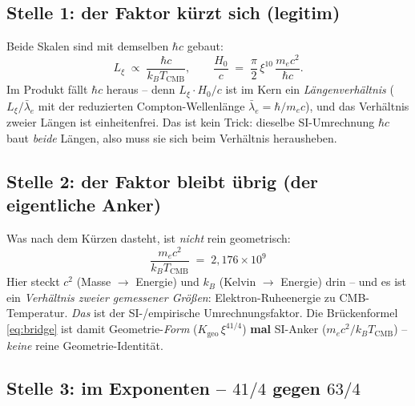 \subsection*{Stelle 1: der Faktor kürzt sich (legitim)}

Beide Skalen sind mit demselben $\hbar c$ gebaut:
\begin{equation}
  L_\xi \;\propto\; \frac{\hbar c}{k_B T_\text{CMB}},
  \qquad
  \frac{H_0}{c} \;=\; \frac{\pi}{2}\,\xi^{10}\,\frac{m_e c^2}{\hbar c}.
\end{equation}
Im Produkt fällt $\hbar c$ heraus -- denn $L_\xi\cdot H_0/c$ ist im Kern ein
\emph{Längenverhältnis} ($L_\xi/\bar\lambda_e$ mit der reduzierten
Compton-Wellenlänge $\bar\lambda_e=\hbar/m_ec$), und das Verhältnis zweier
Längen ist einheitenfrei. Das ist kein Trick: dieselbe SI-Umrechnung $\hbar c$
baut \emph{beide} Längen, also muss sie sich beim Verhältnis herausheben.

\subsection*{Stelle 2: der Faktor bleibt übrig (der eigentliche Anker)}

Was nach dem Kürzen dasteht, ist \emph{nicht} rein geometrisch:
\begin{equation}
  \boxed{\;\frac{m_e c^2}{k_B T_\text{CMB}} \;=\; 2{,}176\times10^{9}\;}
\end{equation}
Hier steckt $c^2$ (Masse $\to$ Energie) und $k_B$ (Kelvin $\to$ Energie) drin --
und es ist ein \emph{Verhältnis zweier gemessener Größen}: Elektron-Ruheenergie
zu CMB-Temperatur. \emph{Das} ist der SI-/empirische Umrechnungsfaktor. Die
Brückenformel \eqref{eq:bridge} ist damit Geometrie-\emph{Form}
($K_\text{geo}\,\xi^{41/4}$) \textbf{mal} SI-Anker
($m_e c^2/k_B T_\text{CMB}$) -- \emph{keine} reine Geometrie-Identität.

\subsection*{Stelle 3: im Exponenten -- $41/4$ gegen $63/4$}

